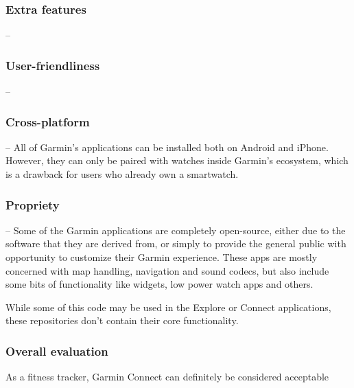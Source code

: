 \subsubsection*{Extra features} -- 
\subsubsection*{User-friendliness} -- 
\subsubsection*{Cross-platform} -- All of Garmin's applications can be installed both on Android and iPhone.
However, they can only be paired with watches inside Garmin's ecosystem, which is a drawback for users who already own a smartwatch.
\subsubsection*{Propriety} -- Some of the Garmin applications are completely open-source, either due to the software that they are derived from, or simply to provide the general public with opportunity to customize their Garmin experience.\cite{garmin-open-source}\cite{garmin-connect-github-repos}
These apps are mostly concerned with map handling, navigation and sound codecs, but also include some bits of functionality like widgets, low power watch apps and others.

While some of this code may be used in the Explore or Connect applications, these repositories don't contain their core functionality.

\subsubsection*{Overall evaluation}
As a fitness tracker, Garmin Connect can definitely be considered acceptable 
